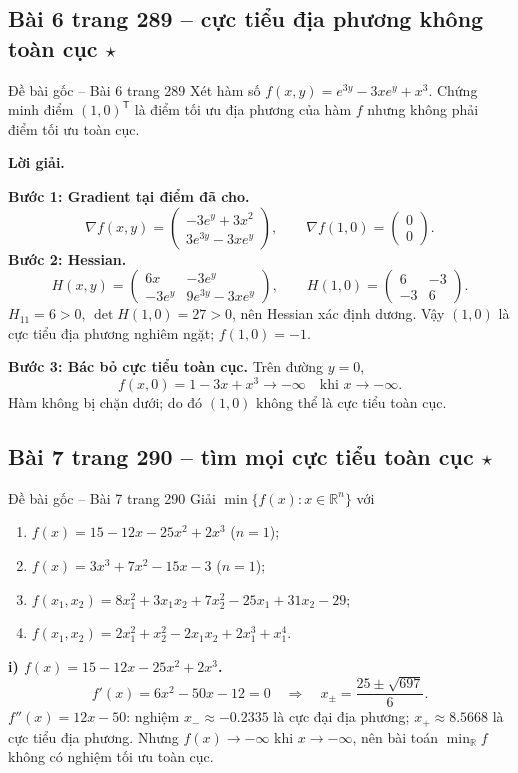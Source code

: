 \documentclass[11pt,a4paper]{article}
\newcommand{\R}{\mathbb{R}}
\newcommand{\grad}{\nabla}
\newcommand{\T}{^{\mathsf T}}
\begin{document}
\subsection{Bài 6 trang 289 -- cực tiểu địa phương không toàn cục \(\star\)}
\begin{questionbox}{Đề bài gốc -- Bài 6 trang 289}
Xét hàm số \(f(x,y)=e^{3y}-3xe^y+x^3\). Chứng minh điểm \((1,0)\T\) là điểm tối ưu địa phương của hàm \(f\) nhưng không phải điểm tối ưu toàn cục.
\end{questionbox}
\textbf{Lời giải.}

\textbf{Bước 1: Gradient tại điểm đã cho.}
\[
\grad f(x,y)=
\begin{pmatrix}-3e^y+3x^2\\3e^{3y}-3xe^y\end{pmatrix},
\qquad \grad f(1,0)=\begin{pmatrix}0\\0\end{pmatrix}.
\]
\textbf{Bước 2: Hessian.}
\[
H(x,y)=
\begin{pmatrix}6x&-3e^y\\-3e^y&9e^{3y}-3xe^y\end{pmatrix},
\qquad
H(1,0)=\begin{pmatrix}6&-3\\-3&6\end{pmatrix}.
\]
\(H_{11}=6>0\), \(\det H(1,0)=27>0\), nên Hessian xác định dương. Vậy \((1,0)\) là cực tiểu địa phương nghiêm ngặt; \(f(1,0)=-1\).

\textbf{Bước 3: Bác bỏ cực tiểu toàn cục.} Trên đường \(y=0\),
\[
f(x,0)=1-3x+x^3\longrightarrow-\infty\quad\text{khi }x\to-\infty.
\]
Hàm không bị chặn dưới; do đó \((1,0)\) không thể là cực tiểu toàn cục.

\subsection{Bài 7 trang 290 -- tìm mọi cực tiểu toàn cục \(\star\)}
\begin{questionbox}{Đề bài gốc -- Bài 7 trang 290}
Giải \(\min\{f(x):x\in\R^n\}\) với
\begin{enumerate}[label=\roman*),nosep,leftmargin=*]
\item \(f(x)=15-12x-25x^2+2x^3\) (\(n=1\));
\item \(f(x)=3x^3+7x^2-15x-3\) (\(n=1\));
\item \(f(x_1,x_2)=8x_1^2+3x_1x_2+7x_2^2-25x_1+31x_2-29\);
\item \(f(x_1,x_2)=2x_1^2+x_2^2-2x_1x_2+2x_1^3+x_1^4\).
\end{enumerate}
\end{questionbox}
\textbf{i) \(f(x)=15-12x-25x^2+2x^3\).}
\[
f'(x)=6x^2-50x-12=0
\quad\Longrightarrow\quad x_{\pm}=\frac{25\pm\sqrt{697}}6.
\]
\(f''(x)=12x-50\): nghiệm \(x_-\approx-0.2335\) là cực đại địa phương; \(x_+\approx8.5668\) là cực tiểu địa phương. Nhưng \(f(x)\to-\infty\) khi \(x\to-\infty\), nên bài toán \(\min_{\R} f\) không có nghiệm tối ưu toàn cục.
\end{document}
